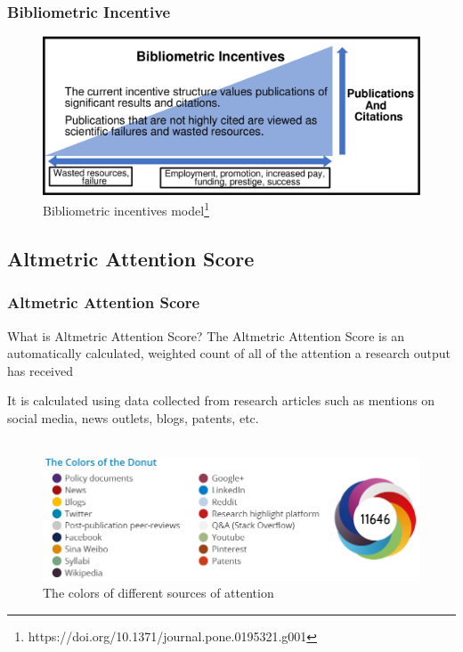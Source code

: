 \documentclass{beamer}
\begin{document}
\begin{frame}
    \frametitle{Bibliometric Incentive}

    \begin{figure}[h]
        \includegraphics[height=0.5\textheight]{bib_incentives.png}
        \caption{Bibliometric incentives model\footnote{https://doi.org/10.1371/journal.pone.0195321.g001}}
    \end{figure}

\end{frame}

\subsection{Altmetric Attention Score}
\begin{frame}
    \frametitle{Altmetric Attention Score}
    \begin{block}{What is Altmetric Attention Score?}
        The Altmetric Attention Score is an automatically calculated, weighted count of all of the attention a research output has received
    \end{block}

    It is calculated using data collected from research articles such as mentions
    on social media, news outlets, blogs, patents, etc.\\~\

    \begin{figure}[h]
        \includegraphics[height=0.41\textheight]{altscore.png}
        \caption{The colors of different sources of attention}
    \end{figure}
\end{frame}
\end{document}
